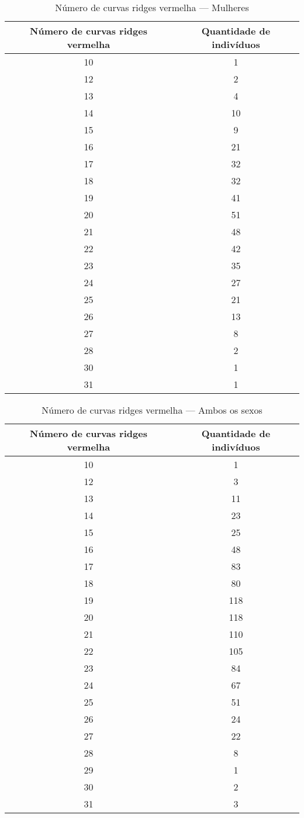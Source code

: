 \documentclass[a4paper,12pt]{article}
\begin{document}
\begin{table}[h!]
\centering
\caption{Número de curvas ridges vermelha — Mulheres}
\begin{tabular}{c c}
\hline
\textbf{Número de curvas ridges vermelha} & \textbf{Quantidade de indivíduos} \\ 
\hline
10 & 1  \\
12 & 2  \\
13 & 4  \\
14 & 10 \\
15 & 9  \\
16 & 21 \\
17 & 32 \\
18 & 32 \\
19 & 41 \\
20 & 51 \\
21 & 48 \\
22 & 42 \\
23 & 35 \\
24 & 27 \\
25 & 21 \\
26 & 13 \\
27 & 8  \\
28 & 2  \\
30 & 1  \\
31 & 1  \\
\hline
\end{tabular}
\end{table}


\begin{table}[h!]
\centering
\caption{Número de curvas ridges vermelha — Ambos os sexos}
\begin{tabular}{c c}
\hline
\textbf{Número de curvas ridges vermelha} & \textbf{Quantidade de indivíduos} \\ 
\hline
10 & 1  \\
12 & 3  \\
13 & 11 \\
14 & 23 \\
15 & 25 \\
16 & 48 \\
17 & 83 \\
18 & 80 \\
19 & 118 \\
20 & 118 \\
21 & 110 \\
22 & 105 \\
23 & 84 \\
24 & 67 \\
25 & 51 \\
26 & 24 \\
27 & 22 \\
28 & 8  \\
29 & 1  \\
30 & 2  \\
31 & 3  \\
\hline
\end{tabular}
\end{table}
\end{document}
